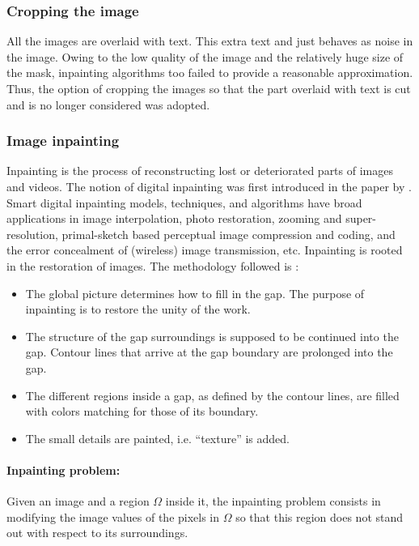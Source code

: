 \documentclass[letterpaper,12pt, onecolumn]{article}%
\begin{document}
\subsubsection*{Cropping the image}
All the images are overlaid with text. This extra text and just behaves as noise in the image. Owing to the low quality of the image and the relatively huge size of the mask, inpainting algorithms too failed to provide a reasonable approximation. Thus, the option of cropping the images so that the part overlaid with text is cut and is no longer considered was adopted. 

\subsubsection*{Image inpainting}
Inpainting is the process of reconstructing lost or deteriorated parts of images and videos. The notion of digital inpainting was first introduced in the paper by \cite{bertalmio2000image}. Smart digital inpainting models, techniques, and algorithms have broad applications in image interpolation, photo restoration, zooming and super-resolution, primal-sketch based perceptual image compression and coding, and the error concealment of (wireless) image transmission, etc. 
Inpainting is rooted in the restoration of images. The methodology followed is : 
\begin{itemize}
\item The global picture determines how to fill in the gap. The purpose of inpainting is to restore the unity of the work.
\item	The structure of the gap surroundings is supposed to be continued into the gap. Contour lines that arrive at the gap boundary are prolonged into the gap.
\item The different regions inside a gap, as defined by the contour lines, are filled with colors matching for those of its boundary.
\item The small details are painted, i.e. \enquote{texture} is added.
\end{itemize}


\paragraph{Inpainting problem:} 
Given an image and a region $\Omega$ inside it, the inpainting problem consists in modifying the image values of the pixels in $\Omega$ so that this region does not stand out with respect to its surroundings.
\end{document}
